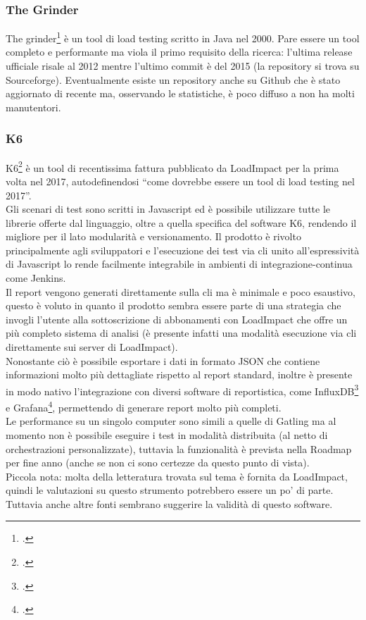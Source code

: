 \subsubsection{The Grinder}
The grinder\footcite{site:thegrinder} è un tool di load testing scritto in Java nel 2000. Pare essere un tool completo e performante ma viola il primo requisito della ricerca: l'ultima release ufficiale risale al 2012 mentre l'ultimo commit è del 2015 (la repository si trova su Sourceforge).
Eventualmente esiste un repository anche su Github che è stato aggiornato di recente ma, osservando le statistiche, è poco diffuso a non ha molti manutentori.
\subsubsection{K6}
K6\footcite{site:k6} è un tool di recentissima fattura pubblicato da LoadImpact per la prima volta nel 2017, autodefinendosi “come dovrebbe essere un tool di load testing nel 2017”. \\
Gli scenari di test sono scritti in Javascript ed è possibile utilizzare tutte le librerie offerte dal linguaggio, oltre a quella specifica del software K6, rendendo il migliore per il lato modularità e versionamento. Il prodotto è rivolto principalmente agli sviluppatori e l'esecuzione dei test via \gls{cli} unito all'espressività di Javascript lo rende facilmente integrabile in ambienti di \gls{integrazione-continua} come Jenkins. \\
Il report vengono generati direttamente sulla \gls{cli} ma è minimale e poco esaustivo, questo è voluto in quanto il prodotto sembra essere parte di una strategia che invogli l'utente alla sottoscrizione di abbonamenti con LoadImpact che offre un più completo sistema di analisi (è presente infatti una modalità esecuzione via \gls{cli} direttamente sui server di LoadImpact). \\
Nonostante ciò è possibile esportare i dati in formato JSON che contiene informazioni molto più dettagliate rispetto al report standard, inoltre è presente in modo nativo l'integrazione con diversi software di reportistica, come InfluxDB\footcite{site:influx} e Grafana\footcite{site:grafana}, permettendo di generare report molto più completi.\\
Le performance su un singolo computer sono simili a quelle di Gatling ma al momento non è possibile eseguire i test in modalità distribuita (al netto di orchestrazioni personalizzate), tuttavia la funzionalità è prevista nella Roadmap per fine anno (anche se non ci sono certezze da questo punto di vista). \\
Piccola nota: molta della letteratura trovata sul tema è fornita da LoadImpact, quindi le valutazioni su questo strumento potrebbero essere un po' di parte. Tuttavia anche altre fonti sembrano suggerire la validità di questo software.
